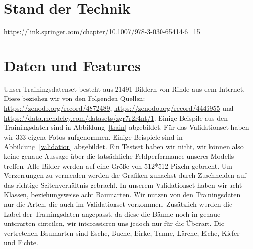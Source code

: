 \documentclass{article}
\begin{document}
\section{Stand der Technik}
\url{https://link.springer.com/chapter/10.1007/978-3-030-65414-6_15}

\section{Daten und Features}

Unser Trainingsdatenset besteht aus 21491 Bildern von Rinde aus dem Internet. Diese beziehen wir von den Folgenden Quellen: \url{https://zenodo.org/record/4872489}, \url{https://zenodo.org/record/4446955} und \url{https://data.mendeley.com/datasets/zgr7r2r4nt/1}. Einige Beispile aus den Trainingsdaten sind in Abbildung~\ref{train} abgebildet. Für das Validationset haben wir 333 eigene Fotos aufgenommen. Einige Beispiele sind in Abbildung~\ref{validation} abgebildet. Ein Testset haben wir nicht, wir können also keine genaue Aussage über die tatsächliche Feldperformance unseres Modells treffen. Alle Bilder werden auf eine Grö\ss e von 512*512 Pixeln gebracht. Um Verzerrungen zu vermeiden werden die Grafiken zunächst durch Zuschneiden auf das richtige Seitenverhältnis gebracht. In unserem Validationset haben wir acht Klassen, beziehungsweise acht Baumarten. Wir nutzen von den Trainingsdaten nur die Arten, die auch im Validationset vorkommen. Zusätzlich wurden die Label der Trainingsdaten angepasst, da diese die Bäume noch in genaue unterarten einteilen, wir interessieren uns jedoch nur für die Überart. Die vertretenen Baumarten sind Esche, Buche, Birke, Tanne, Lärche, Eiche, Kiefer und Fichte.
\end{document}
